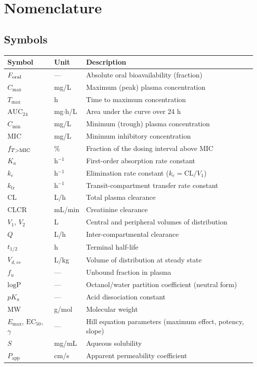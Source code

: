 \chapter*{Nomenclature}

\section*{Symbols}
\begin{table}[H]
\centering
\small
\begin{tabular}{llp{8.5cm}}
\toprule
Symbol & Unit & Description\\
\midrule
$F_{\mathrm{oral}}$ & --- & Absolute oral bioavailability (fraction)\\
$C_{\max}$ & mg/L & Maximum (peak) plasma concentration\\
$T_{\max}$ & h & Time to maximum concentration\\
$\mathrm{AUC}_{24}$ & mg$\cdot$h/L & Area under the curve over 24 h\\
$C_{\min}$ & mg/L & Minimum (trough) plasma concentration\\
$\mathrm{MIC}$ & mg/L & Minimum inhibitory concentration\\
$f_{T>\mathrm{MIC}}$ & \% & Fraction of the dosing interval above MIC\\
$K_a$ & h$^{-1}$ & First-order absorption rate constant\\
$k_e$ & h$^{-1}$ & Elimination rate constant ($k_e = \mathrm{CL}/V_1$)\\
$k_{\mathrm{tr}}$ & h$^{-1}$ & Transit-compartment transfer rate constant\\
$\mathrm{CL}$ & L/h & Total plasma clearance\\
$\mathrm{CLCR}$ & mL/min & Creatinine clearance\\
$V_1$, $V_2$ & L & Central and peripheral volumes of distribution\\
$Q$ & L/h & Inter-compartmental clearance\\
$t_{1/2}$ & h & Terminal half-life\\
$V_{d,ss}$ & L/kg & Volume of distribution at steady state\\
$f_u$ & --- & Unbound fraction in plasma\\
$\mathrm{logP}$ & --- & Octanol/water partition coefficient (neutral form)\\
$pK_a$ & --- & Acid dissociation constant\\
$\mathrm{MW}$ & g/mol & Molecular weight\\
$E_{\max}$, $\mathrm{EC}_{50}$, $\gamma$ & --- & Hill equation parameters (maximum effect, potency, slope)\\
$S$ & mg/mL & Aqueous solubility\\
$P_{\mathrm{app}}$ & cm/s & Apparent permeability coefficient\\
\bottomrule
\end{tabular}
\end{table}

